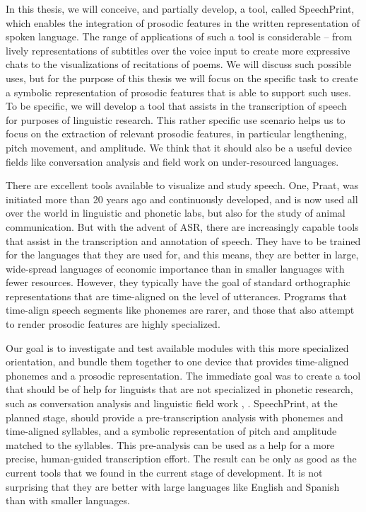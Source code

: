 In this thesis, we will conceive, and partially develop, a tool, called SpeechPrint, which enables the integration of prosodic features in the written representation of spoken language. The range of applications of such a tool is considerable -- from lively representations of subtitles over the voice input to create more expressive chats to the visualizations of recitations of poems. We will discuss such possible uses, but for the purpose of this thesis we will focus on the specific task to create a symbolic representation of prosodic features that is able to support such uses. To be specific, we will develop a tool that assists in the transcription of speech for purposes of linguistic research. This rather specific use scenario helps us to focus on the extraction of relevant prosodic features, in particular lengthening, pitch movement, and amplitude. We think that it should also be a useful device fields like conversation analysis and field work on under-resourced languages. 

There are excellent tools available to visualize and study speech. One, Praat, was initiated more than 20 years ago and continuously developed, and is now used all over the world in linguistic and phonetic labs, but also for the study of animal communication. But with the advent of ASR, there are increasingly capable tools that assist in the transcription and annotation of speech. They have to be trained for the languages that they are used for, and this means, they are better in large, wide-spread languages of economic importance than in smaller languages with fewer resources. However, they typically have the goal of standard orthographic representations that are time-aligned on the level of utterances. Programs that time-align speech segments like phonemes are rarer, and those that also attempt to render prosodic features are highly specialized. 

Our goal is to investigate and test available modules with this more specialized orientation, and bundle them together to one device that provides time-aligned phonemes and a prosodic representation. The immediate goal was to create a tool that should be of help for linguists that are not specialized in phonetic research, such as conversation analysis \cite{hutchby2008} and linguistic field work \cite{thieberger2012}, \cite{rozhanskiy2021}. SpeechPrint, at the planned stage, should provide a pre-transcription analysis with phonemes and time-aligned syllables, and a symbolic representation of pitch and amplitude matched to the syllables. This pre-analysis can be used as a help for a more precise, human-guided transcription effort. The result can be only as good as the current tools that we found in the current stage of development. It is not surprising that they are better with large languages like English and Spanish than with smaller languages. 

